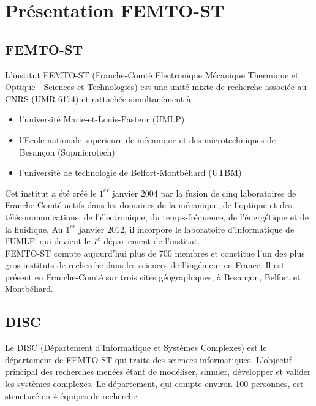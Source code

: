 \section{Présentation FEMTO-ST}
\label{sec:pres_entreprise}

\subsection{FEMTO-ST}
\label{sec:FEMTO_ST}

L'institut FEMTO-ST (Franche-Comté Electronique Mécanique Thermique et Optique - Sciences et Technologies) est une unité mixte de recherche associée au CNRS (UMR 6174) et rattachée simultanément à :

\begin{itemize}[label=$\bullet$]
    \item l'université Marie-et-Louis-Pasteur (UMLP)
    \item l'Ecole nationale supérieure de mécanique et des microtechniques de Besançon (Supmicrotech)
    \item l'université de technologie de Belfort-Montbéliard (UTBM)
\end{itemize}

Cet institut a été créé le $1^{er}$ janvier 2004 par la fusion de cinq laboratoires de Franche-Comté actifs dans les domaines de la mécanique, de l'optique et des télécommunications, de l'électronique, du temps-fréquence, de l'énergétique et de la fluidique. Au $1^{er}$ janvier 2012, il incorpore le laboratoire d'informatique de l'UMLP, qui devient le $7^{e}$ département de l'institut. \\

FEMTO-ST compte aujourd'hui plus de 700 membres et constitue l'un des plus gros instituts de recherche dans les sciences de l'ingénieur en France. Il est présent en Franche-Comté sur trois sites géographiques, à Besançon, Belfort et Montbéliard.

\subsection{DISC}
\label{sec:DISC}

Le DISC (Département d'Informatique et Systèmes Complexes) est le département de FEMTO-ST qui traite des sciences informatiques. L'objectif principal des recherches menées étant de modéliser, simuler, développer et valider les systèmes complexes. Le département, qui compte environ 100 personnes, est structuré en 4 équipes de recherche :

